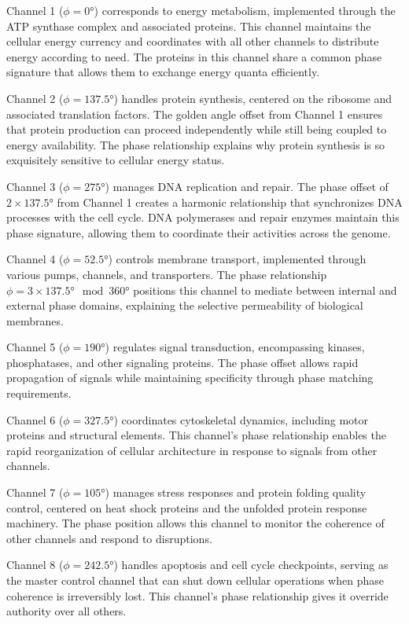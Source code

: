 \documentclass[12pt,a4paper]{report}
\begin{document}
Channel 1 ($\phi = 0°$) corresponds to energy metabolism, implemented through the ATP synthase complex and associated proteins. This channel maintains the cellular energy currency and coordinates with all other channels to distribute energy according to need. The proteins in this channel share a common phase signature that allows them to exchange energy quanta efficiently.

Channel 2 ($\phi = 137.5°$) handles protein synthesis, centered on the ribosome and associated translation factors. The golden angle offset from Channel 1 ensures that protein production can proceed independently while still being coupled to energy availability. The phase relationship explains why protein synthesis is so exquisitely sensitive to cellular energy status.

Channel 3 ($\phi = 275°$) manages DNA replication and repair. The phase offset of $2 \times 137.5°$ from Channel 1 creates a harmonic relationship that synchronizes DNA processes with the cell cycle. DNA polymerases and repair enzymes maintain this phase signature, allowing them to coordinate their activities across the genome.

Channel 4 ($\phi = 52.5°$) controls membrane transport, implemented through various pumps, channels, and transporters. The phase relationship $\phi = 3 \times 137.5° \mod 360°$ positions this channel to mediate between internal and external phase domains, explaining the selective permeability of biological membranes.

Channel 5 ($\phi = 190°$) regulates signal transduction, encompassing kinases, phosphatases, and other signaling proteins. The phase offset allows rapid propagation of signals while maintaining specificity through phase matching requirements.

Channel 6 ($\phi = 327.5°$) coordinates cytoskeletal dynamics, including motor proteins and structural elements. This channel's phase relationship enables the rapid reorganization of cellular architecture in response to signals from other channels.

Channel 7 ($\phi = 105°$) manages stress responses and protein folding quality control, centered on heat shock proteins and the unfolded protein response machinery. The phase position allows this channel to monitor the coherence of other channels and respond to disruptions.

Channel 8 ($\phi = 242.5°$) handles apoptosis and cell cycle checkpoints, serving as the master control channel that can shut down cellular operations when phase coherence is irreversibly lost. This channel's phase relationship gives it override authority over all others.
\end{document}
